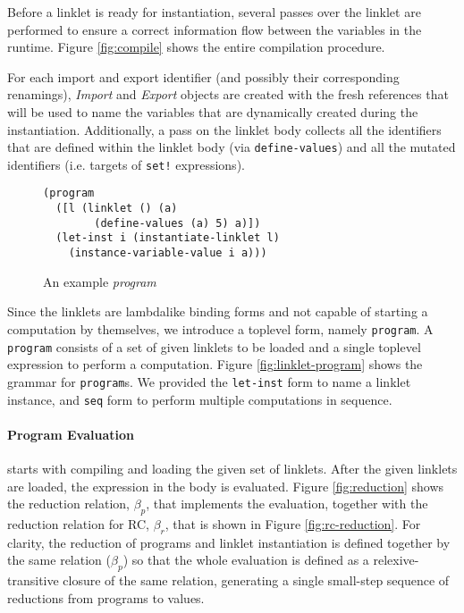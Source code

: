 Before a linklet is ready for instantiation, several passes over the
linklet are performed to ensure a correct information flow between the
variables in the run\dash time. Figure \ref{fig:compile} shows the
entire compilation procedure.

For each import and export identifier (and possibly their
corresponding renamings), \textit{Import} and \textit{Export} objects
are created with the fresh references that will be used to name the
variables that are dynamically created during the
instantiation. Additionally, a pass on the linklet body collects all
the identifiers that are defined within the linklet body (via
\verb|define-values|) and all the mutated identifiers (i.e. targets of
\verb|set!| expressions).

\begin{figure}[h]
  \begin{mdframed}
\begin{verbatim}
(program
  ([l (linklet () (a)
        (define-values (a) 5) a)])
  (let-inst i (instantiate-linklet l)
    (instance-variable-value i a)))
\end{verbatim}
\caption{An example \textit{program}}
\label{fig:program-example}
  \end{mdframed}
\end{figure}

Since the linklets are lambda\dash like binding forms and not capable
of starting a computation by themselves, we introduce a top\dash level
form, namely \verb|program|. A \verb|program| consists of a set of
given linklets to be loaded and a single top\dash level expression to
perform a computation. Figure \ref{fig:linklet-program} shows the
grammar for \verb|program|s. We provided the \verb|let-inst| form to
name a linklet instance, and \verb|seq| form to perform multiple
computations in sequence.

\paragraph{Program Evaluation} starts with compiling and loading the given
set of linklets. After the given linklets are loaded, the expression
in the body is evaluated. Figure \ref{fig:reduction} shows the
reduction relation, $\beta_p$, that implements the evaluation, together
with the reduction relation for RC, $\beta_r$, that is shown in Figure
\ref{fig:rc-reduction}. For clarity, the reduction of programs and
linklet instantiation is defined together by the same relation ($\beta_p$)
so that the whole evaluation is defined as a relexive-transitive
closure of the same relation, generating a single small-step sequence
of reductions from programs to values.

